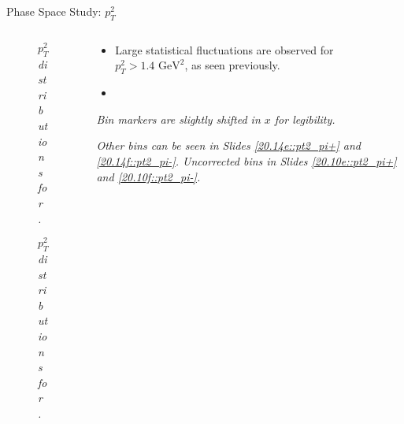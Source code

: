 \begin{frame}{Phase Space Study: $p_T^2$}
    \label{12.15::pt2}

    \begin{columns}[onlytextwidth,T]

    \begin{column}{.44\linewidth}
        \vspace{-15pt}
        \begin{center}
            \begin{figure}[t]
                \scriptsize{\textit{$p_T^2$ distributions for \ef{$\pi^-$}.}}
            \end{figure}

            \vspace{-9pt}
            \begin{figure}[t]
                \scriptsize{\textit{$p_T^2$ distributions for \ef{$\pi^+$}.}}
            \end{figure}
        \end{center}
    \end{column}

    \begin{column}{.54\linewidth}
        \begin{itemize}
            \item
                Large statistical fluctuations are observed for $p_T^2 > 1.4 \text{ GeV}^2$, as seen previously.

            \vspace{12pt}
            \item
        \end{itemize}

        \vspace{105pt}

        \begin{flushright}
            \tiny{\textit{Bin markers are slightly shifted in $x$ for legibility.}}

            \vspace{-0.5pt}

            \tiny{\textit{
                Other bins can be seen in Slides \textcolor{efd_purple}{\ref{20.14e::pt2_pi+}} and \textcolor{efd_purple}{\ref{20.14f::pt2_pi-}}.
                Uncorrected bins in Slides \textcolor{efd_purple}{\ref{20.10e::pt2_pi+}} and \textcolor{efd_purple}{\ref{20.10f::pt2_pi-}}.
            }}
        \end{flushright}
    \end{column}

    \end{columns}
\end{frame}

